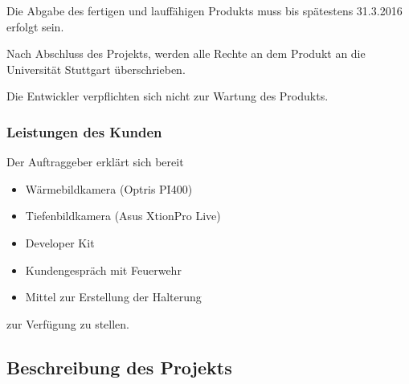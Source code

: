 Die Abgabe des fertigen und lauffähigen Produkts muss bis spätestens 31.3.2016 erfolgt sein.

Nach Abschluss des Projekts, werden alle Rechte an dem Produkt an die Universität Stuttgart überschrieben.

Die Entwickler verpflichten sich nicht zur Wartung des Produkts.

\subsubsection{Leistungen des Kunden}
Der Auftraggeber erklärt sich bereit
\begin{itemize}
	\item Wärmebildkamera (Optris  PI400)
	\item Tiefenbildkamera (Asus XtionPro Live)
	\item \meta Developer Kit
	\item Kundengespräch mit Feuerwehr
	\item Mittel zur Erstellung der Halterung
\end{itemize}
zur Verfügung zu stellen.

\subsection{Beschreibung des Projekts}

